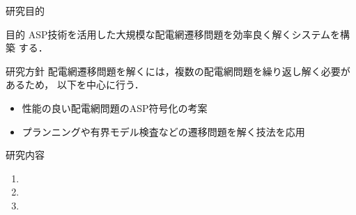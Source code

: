 \documentclass[dvipdfmx,11pt]{beamer}
\begin{document}
\begin{frame}{研究目的}
  \begin{alertblock}{目的}
   ASP技術を活用した大規模な配電網遷移問題を効率良く解くシステムを構築
   する．
  \end{alertblock}
  \vfill
\begin{exampleblock}{研究方針}
 配電網遷移問題を解くには，複数の配電網問題を繰り返し解く必要があるため，
 以下を中心に行う．
 \begin{itemize}
  \item 性能の良い配電網問題のASP符号化の考案
  \item プランニングや有界モデル検査などの遷移問題を解く技法を応用
 \end{itemize}

\end{exampleblock}
 \begin{block}{研究内容}
  \begin{enumerate}
   \item {}
   \item {}
   \item {}
  \end{enumerate}
 \end{block}
\end{frame}
\end{document}
